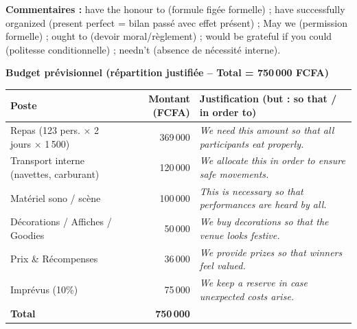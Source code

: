 \documentclass[11pt]{article}
\newcommand{\cle}[1]{{\popxbold\color{popdark}#1}}
\begin{document}
\begin{corrige}
\textbf{Commentaires :} \cle{have the honour to} (formule figée formelle) ; \cle{have successfully organized} (present perfect = bilan passé avec effet présent) ; \cle{May we} (permission formelle) ; \cle{ought to} (devoir moral/règlement) ; \cle{would be grateful if you could} (politesse conditionnelle) ; \cle{needn't} (absence de nécessité interne).

\textbf{Budget prévisionnel (répartition justifiée -- Total = 750\,000 FCFA)}

\begin{center}
\begin{tabularx}{\linewidth}{|l|r|X|}\hline
\textbf{Poste} & \textbf{Montant (FCFA)} & \textbf{Justification (but : so that / in order to)} \\ \hline
Repas (123 pers. $\times$ 2 jours $\times$ 1\,500) & 369\,000 & \emph{We need this amount so that all participants eat properly.} \\ \hline
Transport interne (navettes, carburant) & 120\,000 & \emph{We allocate this in order to ensure safe movements.} \\ \hline
Matériel sono / scène & 100\,000 & \emph{This is necessary so that performances are heard by all.} \\ \hline
Décorations / Affiches / Goodies & 50\,000 & \emph{We buy decorations so that the venue looks festive.} \\ \hline
Prix \& Récompenses & 36\,000 & \emph{We provide prizes so that winners feel valued.} \\ \hline
Imprévus (10\%) & 75\,000 & \emph{We keep a reserve in case unexpected costs arise.} \\ \hline
\textbf{Total} & \textbf{750\,000} & \\ \hline
\end{tabularx}
\end{center}
\end{corrige}
\end{document}
